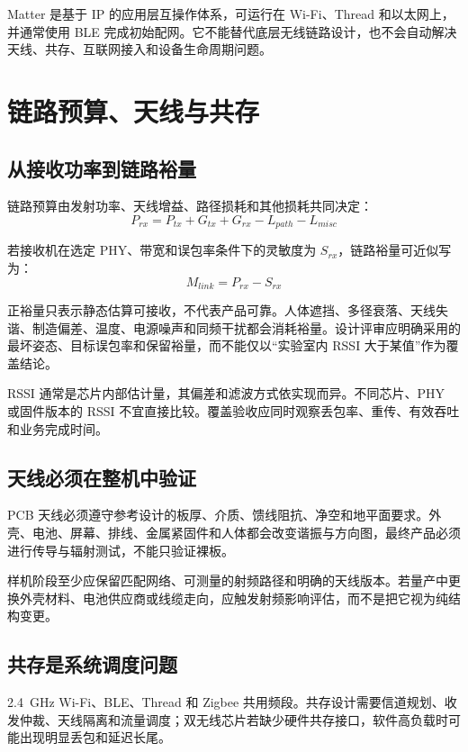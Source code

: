 Matter 是基于 IP 的应用层互操作体系，可运行在 Wi-Fi、Thread 和以太网上，并通常使用 BLE 完成初始配网\cite{matter-spec}。它不能替代底层无线链路设计，也不会自动解决天线、共存、互联网接入和设备生命周期问题。

\section{链路预算、天线与共存}

\subsection{从接收功率到链路裕量}

链路预算由发射功率、天线增益、路径损耗和其他损耗共同决定：
\begin{equation}
  P_{rx}=P_{tx}+G_{tx}+G_{rx}-L_{path}-L_{misc}
\end{equation}

若接收机在选定 PHY、带宽和误包率条件下的灵敏度为 $S_{rx}$，链路裕量可近似写为：
\begin{equation}
  M_{link}=P_{rx}-S_{rx}
\end{equation}

正裕量只表示静态估算可接收，不代表产品可靠。人体遮挡、多径衰落、天线失谐、制造偏差、温度、电源噪声和同频干扰都会消耗裕量。设计评审应明确采用的最坏姿态、目标误包率和保留裕量，而不能仅以“实验室内 RSSI 大于某值”作为覆盖结论。

RSSI 通常是芯片内部估计量，其偏差和滤波方式依实现而异。不同芯片、PHY 或固件版本的 RSSI 不宜直接比较。覆盖验收应同时观察丢包率、重传、有效吞吐和业务完成时间。

\subsection{天线必须在整机中验证}

PCB 天线必须遵守参考设计的板厚、介质、馈线阻抗、净空和地平面要求。外壳、电池、屏幕、排线、金属紧固件和人体都会改变谐振与方向图，最终产品必须进行传导与辐射测试，不能只验证裸板。

样机阶段至少应保留匹配网络、可测量的射频路径和明确的天线版本。若量产中更换外壳材料、电池供应商或线缆走向，应触发射频影响评估，而不是把它视为纯结构变更。

\subsection{共存是系统调度问题}

2.4~GHz Wi-Fi、BLE、Thread 和 Zigbee 共用频段。共存设计需要信道规划、收发仲裁、天线隔离和流量调度；双无线芯片若缺少硬件共存接口，软件高负载时可能出现明显丢包和延迟长尾。

